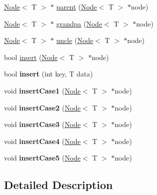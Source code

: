 \begin{DoxyCompactItemize}
\hyperlink{class_node}{Node}$<$ T $>$ $\ast$ \hyperlink{class_r_b_tree_aabfe3497ee633a9864ec84fdb153c67d}{parent} (\hyperlink{class_node}{Node}$<$ T $>$ $\ast$node)
\item 
\hyperlink{class_node}{Node}$<$ T $>$ $\ast$ \hyperlink{class_r_b_tree_a9c1ef0de31b6bf2617a458a0e9d0bcef}{grandpa} (\hyperlink{class_node}{Node}$<$ T $>$ $\ast$node)
\item 
\hyperlink{class_node}{Node}$<$ T $>$ $\ast$ \hyperlink{class_r_b_tree_af60f8017b52f69173e0af61c8e581b48}{uncle} (\hyperlink{class_node}{Node}$<$ T $>$ $\ast$node)
\item 
bool \hyperlink{class_r_b_tree_a8f67ba964a14d252ff6851a46576399e}{insert} (\hyperlink{class_node}{Node}$<$ T $>$ $\ast$node)
\item 
\hypertarget{class_r_b_tree_a8e7398a4728854fa2500bf707a499dcf}{}bool {\bfseries insert} (int key, T data)\label{class_r_b_tree_a8e7398a4728854fa2500bf707a499dcf}

\item 
\hypertarget{class_r_b_tree_af588082e194aecea7a6c2438f685f2cd}{}void {\bfseries insert\+Case1} (\hyperlink{class_node}{Node}$<$ T $>$ $\ast$node)\label{class_r_b_tree_af588082e194aecea7a6c2438f685f2cd}

\item 
\hypertarget{class_r_b_tree_ace7e466e4b1412df108d9d88fcceffbf}{}void {\bfseries insert\+Case2} (\hyperlink{class_node}{Node}$<$ T $>$ $\ast$node)\label{class_r_b_tree_ace7e466e4b1412df108d9d88fcceffbf}

\item 
\hypertarget{class_r_b_tree_ad20010a77dd3e98f1737f5cbc2aa72c0}{}void {\bfseries insert\+Case3} (\hyperlink{class_node}{Node}$<$ T $>$ $\ast$node)\label{class_r_b_tree_ad20010a77dd3e98f1737f5cbc2aa72c0}

\item 
\hypertarget{class_r_b_tree_a0b05cf578a21098cf28451c7c1dea619}{}void {\bfseries insert\+Case4} (\hyperlink{class_node}{Node}$<$ T $>$ $\ast$node)\label{class_r_b_tree_a0b05cf578a21098cf28451c7c1dea619}

\item 
\hypertarget{class_r_b_tree_ab1d1644cf1e55879f32aeb1415c24b18}{}void {\bfseries insert\+Case5} (\hyperlink{class_node}{Node}$<$ T $>$ $\ast$node)\label{class_r_b_tree_ab1d1644cf1e55879f32aeb1415c24b18}

\end{DoxyCompactItemize}


\subsection{Detailed Description}
